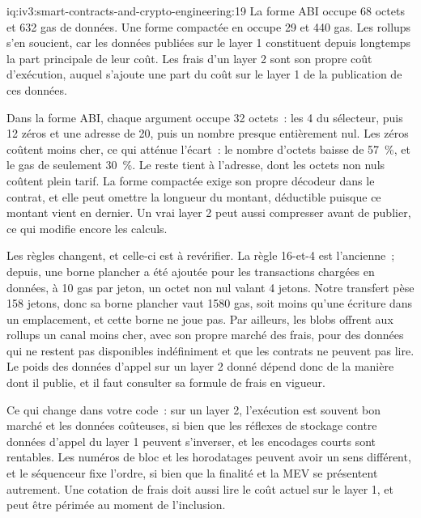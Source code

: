 \begin{solution}{iq:iv3:smart-contracts-and-crypto-engineering:19}
La forme ABI occupe 68 octets et 632 gas de données. Une forme compactée en occupe 29 et 440 gas. Les rollups s'en soucient, car les données publiées sur le layer 1 constituent depuis longtemps la part principale de leur coût. Les frais d'un layer 2 sont son propre coût d'exécution, auquel s'ajoute une part du coût sur le layer 1 de la publication de ces données.
\enlargethispage{-3\baselineskip}%
\label{lst:iv3:cr:calldata}

Dans la forme ABI, chaque argument occupe 32 octets~: les 4 du sélecteur, puis 12 zéros et une adresse de 20, puis un nombre presque entièrement nul. Les zéros coûtent moins cher, ce qui atténue l'écart~: le nombre d'octets baisse de 57~\%, et le gas de seulement 30~\%. Le reste tient à l'adresse, dont les octets non nuls coûtent plein tarif. La forme compactée exige son propre décodeur dans le contrat, et elle peut omettre la longueur du montant, déductible puisque ce montant vient en dernier. Un vrai layer 2 peut aussi compresser avant de publier, ce qui modifie encore les calculs.

Les règles changent, et celle-ci est à revérifier. La règle 16-et-4 est l'ancienne~; depuis, une borne plancher a été ajoutée pour les transactions chargées en données, à 10 gas par jeton, un octet non nul valant 4 jetons. Notre transfert pèse 158 jetons, donc sa borne plancher vaut 1580 gas, soit moins qu'une écriture dans un emplacement, et cette borne ne joue pas. Par ailleurs, les blobs offrent aux rollups un canal moins cher, avec son propre marché des frais, pour des données qui ne restent pas disponibles indéfiniment et que les contrats ne peuvent pas lire. Le poids des données d'appel sur un layer 2 donné dépend donc de la manière dont il publie, et il faut consulter sa formule de frais en vigueur.

Ce qui change dans votre code~: sur un layer 2, l'exécution est souvent bon marché et les données coûteuses, si bien que les réflexes de stockage contre données d'appel du layer 1 peuvent s'inverser, et les encodages courts sont rentables. Les numéros de bloc et les horodatages peuvent avoir un sens différent, et le séquenceur fixe l'ordre, si bien que la finalité et la MEV se présentent autrement. Une cotation de frais doit aussi lire le coût actuel sur le layer 1, et peut être périmée au moment de l'inclusion.

\end{solution}

